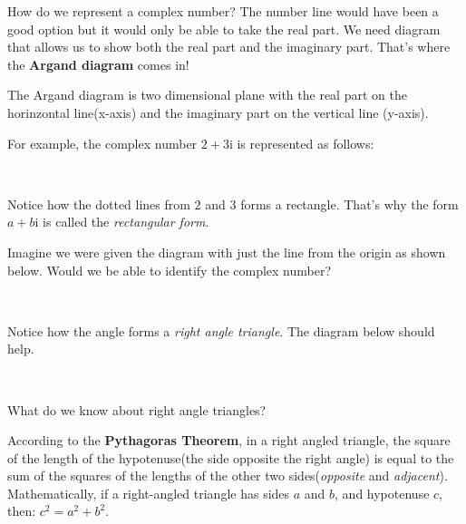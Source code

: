 \documentclass[11pt]{article}
\begin{document}
    How do we represent a complex number? The number line would have been a
good option but it would only be able to take the real part. We need
diagram that allows us to show both the real part and the imaginary
part. That's where the \textbf{Argand diagram} comes in!

The Argand diagram is two dimensional plane with the real part on the
horinzontal line(x-axis) and the imaginary part on the vertical line
(y-axis).

For example, the complex number \(2 + 3\mathrm{i}\) is represented as
follows:

    \begin{center}
    \end{center}
    { \hspace*{\fill} \\}
    
    Notice how the dotted lines from \(2\) and \(3\) forms a rectangle.
That's why the form \(a + b\mathrm{i}\) is called the \emph{rectangular
form}.

Imagine we were given the diagram with just the line from the origin as
shown below. Would we be able to identify the complex number?

    \begin{center}
    \end{center}
    { \hspace*{\fill} \\}
    
    Notice how the angle forms a \emph{right angle triangle}. The diagram
below should help.

    \begin{center}
    \end{center}
    { \hspace*{\fill} \\}
    
    What do we know about right angle triangles?

According to the \textbf{Pythagoras Theorem}, in a right angled
triangle, the square of the length of the hypotenuse(the side opposite
the right angle) is equal to the sum of the squares of the lengths of
the other two sides(\emph{opposite} and \emph{adjacent}).
Mathematically, if a right-angled triangle has sides \(a\) and \(b\),
and hypotenuse \(c\), then: \(c^2 = a^2 + b^2\).
\end{document}
